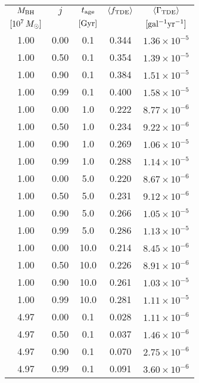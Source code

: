 \documentclass[useAMS,usenatbib]{mn2e}
\def\msun{M_{\rm \odot}}
\def\mBH{M_{\rm BH}}
\def\GammaTDE{\Gamma_{\rm TDE}}
\def\fTDE{f_{\rm TDE}}
\def\tage{t_{\rm age}}
\def\Gyr{{\rm Gyr}}
\newcommand{\lara}[1]{\left\langle{#1}\right\rangle}
\begin{document}
\begin{table}
    \centering
    \begin{tabular}{ccccc}
    \hline
    $\mBH$ & $j$ & $\tage$ & $\lara{\fTDE}$ & $\lara{\GammaTDE}$\\
    $[10^7\,\msun]$ & & $[\Gyr]$ & & $[\rm gal^{-1}yr^{-1}]$\\
    \hline
            1.00 & 0.00 &          0.1 & 0.344 & $1.36\times10^{-5}$ \\
            1.00 & 0.50 &          0.1 & 0.354 & $1.39\times10^{-5}$ \\
            1.00 & 0.90 &          0.1 & 0.384 & $1.51\times10^{-5}$ \\
            1.00 & 0.99 &          0.1 & 0.400 & $1.58\times10^{-5}$ \\
            1.00 & 0.00 &          1.0 & 0.222 & $8.77\times10^{-6}$ \\
            1.00 & 0.50 &          1.0 & 0.234 & $9.22\times10^{-6}$ \\
            1.00 & 0.90 &          1.0 & 0.269 & $1.06\times10^{-5}$ \\
            1.00 & 0.99 &          1.0 & 0.288 & $1.14\times10^{-5}$ \\
            1.00 & 0.00 &          5.0 & 0.220 & $8.67\times10^{-6}$ \\
            1.00 & 0.50 &          5.0 & 0.231 & $9.12\times10^{-6}$ \\
            1.00 & 0.90 &          5.0 & 0.266 & $1.05\times10^{-5}$ \\
            1.00 & 0.99 &          5.0 & 0.286 & $1.13\times10^{-5}$ \\
            1.00 & 0.00 &         10.0 & 0.214 & $8.45\times10^{-6}$ \\
            1.00 & 0.50 &         10.0 & 0.226 & $8.91\times10^{-6}$ \\
            1.00 & 0.90 &         10.0 & 0.261 & $1.03\times10^{-5}$ \\
            1.00 & 0.99 &         10.0 & 0.281 & $1.11\times10^{-5}$ \\
            4.97 & 0.00 &          0.1 & 0.028 & $1.11\times10^{-6}$ \\
            4.97 & 0.50 &          0.1 & 0.037 & $1.46\times10^{-6}$ \\
            4.97 & 0.90 &          0.1 & 0.070 & $2.75\times10^{-6}$ \\
            4.97 & 0.99 &          0.1 & 0.091 & $3.60\times10^{-6}$ \\

\end{tabular}
\end{table}
\end{document}
